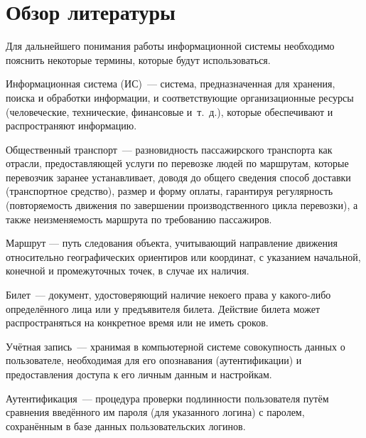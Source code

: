 \section{Обзор литературы}
Для дальнейшего понимания работы информационной системы необходимо пояснить некоторые термины, которые будут использоваться.
\begin{definition}
    Информационная система (ИС) — система, предназначенная для хранения, поиска и обработки информации, и соответствующие организационные ресурсы (человеческие, технические, финансовые и т. д.), которые обеспечивают и распространяют информацию.
\end{definition}
\begin{definition}
    Общественный транспорт — разновидность пассажирского транспорта как отрасли, предоставляющей услуги по перевозке людей по маршрутам, которые перевозчик заранее устанавливает, доводя до общего сведения способ доставки (транспортное средство), размер и форму оплаты, гарантируя регулярность (повторяемость движения по завершении производственного цикла перевозки), а также неизменяемость маршрута по требованию пассажиров. 
\end{definition}
\begin{definition}
    Маршрут — путь следования объекта, учитывающий направление движения относительно географических ориентиров или координат, с указанием начальной, конечной и промежуточных точек, в случае их наличия. 
\end{definition}
\begin{definition}
    Билет —  документ, удостоверяющий наличие некоего права у какого-либо определённого лица или у предъявителя билета. Действие билета может распространяться на конкретное время или не иметь сроков. 
\end{definition}
\begin{definition}
    Учётная запись — хранимая в компьютерной системе совокупность данных о пользователе, необходимая для его опознавания (аутентификации) и предоставления доступа к его личным данным и настройкам.
\end{definition}
\begin{definition}
    Аутентификация — процедура проверки подлинности пользователя путём сравнения введённого им пароля (для указанного логина) с паролем, сохранённым в базе данных пользовательских логинов.
\end{definition}